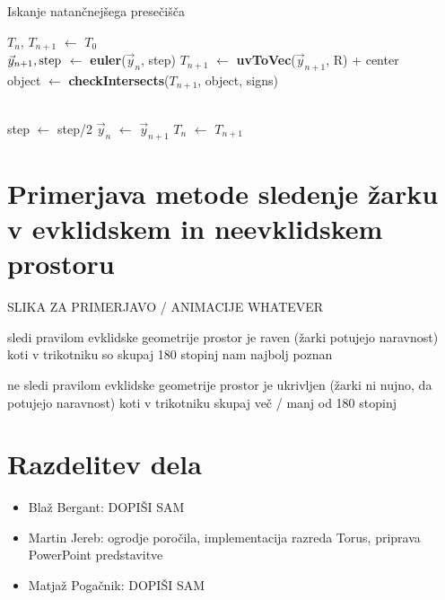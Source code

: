 \documentclass[titlepage]{article}
\begin{document}
\begin{algorithm}
    \caption{Iskanje natančnejšega presečišča}
\begin{algorithmic}

    \State $T_{n}$, $T_{n+1}$ $\gets$ $T_{0}$
    \\
      \State {}
    \EndIf
    \State $\vec{y}_{n+1}, \hbox{step}$ $\gets$ \textbf{euler}($\vec{y}_{n}$, step)
    \State $T_{n+1}$ $\gets$ \textbf{uvToVec}($\vec{y}_{n+1}$, R) + center
    \\
    \State object $\gets$ \textbf{checkIntersects}($T_{n+1}$, object, signs)
    \\
    \\

        \State step $\gets$ step/2
    \Else
      \State $\vec{y}_{n}$ $\gets$ $\vec{y}_{n+1}$
      \State $T_{n}$ $\gets$ $T_{n+1}$
    \EndIf
  \EndWhile
\EndFunction
\end{algorithmic}
\end{algorithm}

\section {Primerjava metode sledenje žarku v evklidskem in neevklidskem prostoru}

SLIKA ZA PRIMERJAVO / ANIMACIJE WHATEVER


sledi pravilom evklidske geometrije
prostor je raven (žarki potujejo naravnost)
koti v trikotniku so skupaj 180 stopinj
nam najbolj poznan

ne sledi pravilom evklidske geometrije
prostor je ukrivljen (žarki ni nujno, da potujejo naravnost)
koti v trikotniku skupaj več / manj od  180 stopinj


\section{Razdelitev dela}
\begin{itemize}
  \item Blaž Bergant: DOPIŠI SAM
  \item Martin Jereb: ogrodje poročila, implementacija razreda Torus, priprava PowerPoint predstavitve
  \item Matjaž Pogačnik: DOPIŠI SAM 
\end{itemize}
\end{document}
